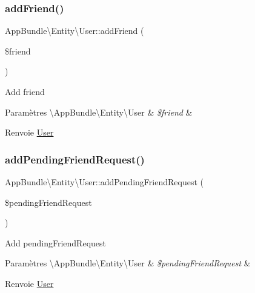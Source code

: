 \subsubsection{\texorpdfstring{add\+Friend()}{addFriend()}}
{\footnotesize\ttfamily App\+Bundle\textbackslash{}\+Entity\textbackslash{}\+User\+::add\+Friend (\begin{DoxyParamCaption}\item[{\hyperlink{classAppBundle_1_1Entity_1_1User}{User}}]{\$friend }\end{DoxyParamCaption})}

Add friend


\begin{DoxyParams}[1]{Paramètres}
\textbackslash{}\+App\+Bundle\textbackslash{}\+Entity\textbackslash{}\+User & {\em \$friend} & \\
\hline
\end{DoxyParams}
\begin{DoxyReturn}{Renvoie}
\hyperlink{classAppBundle_1_1Entity_1_1User}{User} 
\end{DoxyReturn}
\mbox{\label{classAppBundle_1_1Entity_1_1User_ac8d0736d889ebc08338ad70f69765369}} 
\subsubsection{\texorpdfstring{add\+Pending\+Friend\+Request()}{addPendingFriendRequest()}}
{\footnotesize\ttfamily App\+Bundle\textbackslash{}\+Entity\textbackslash{}\+User\+::add\+Pending\+Friend\+Request (\begin{DoxyParamCaption}\item[{\textbackslash{}\hyperlink{classAppBundle_1_1Entity_1_1User}{App\+Bundle\textbackslash{}\+Entity\textbackslash{}\+User}}]{\$pending\+Friend\+Request }\end{DoxyParamCaption})}

Add pending\+Friend\+Request


\begin{DoxyParams}[1]{Paramètres}
\textbackslash{}\+App\+Bundle\textbackslash{}\+Entity\textbackslash{}\+User & {\em \$pending\+Friend\+Request} & \\
\hline
\end{DoxyParams}
\begin{DoxyReturn}{Renvoie}
\hyperlink{classAppBundle_1_1Entity_1_1User}{User} 
\end{DoxyReturn}
\mbox{\label{classAppBundle_1_1Entity_1_1User_a4fa2fe6e700686a54540db892955f6dc}} 
